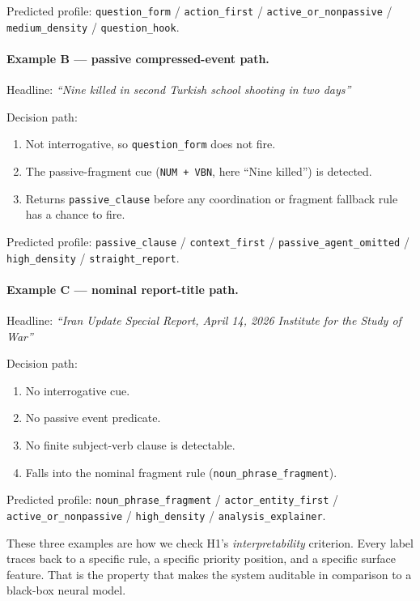\documentclass[11pt]{article}
\begin{document}
Predicted profile: \texttt{question\_form} / \texttt{action\_first} / \texttt{active\_or\_nonpassive} / \texttt{medium\_density} / \texttt{question\_hook}.

\paragraph{Example B --- passive compressed-event path.} Headline: \emph{``Nine killed in second Turkish school shooting in two days''}

Decision path:
\begin{enumerate}
    \item Not interrogative, so \texttt{question\_form} does not fire.
    \item The passive-fragment cue (\texttt{NUM + VBN}, here ``Nine killed'') is detected.
    \item Returns \texttt{passive\_clause} before any coordination or fragment fallback rule has a chance to fire.
\end{enumerate}

Predicted profile: \texttt{passive\_clause} / \texttt{context\_first} / \texttt{passive\_agent\_omitted} / \texttt{high\_density} / \texttt{straight\_report}.

\paragraph{Example C --- nominal report-title path.} Headline: \emph{``Iran Update Special Report, April 14, 2026 Institute for the Study of War''}

Decision path:
\begin{enumerate}
    \item No interrogative cue.
    \item No passive event predicate.
    \item No finite subject-verb clause is detectable.
    \item Falls into the nominal fragment rule (\texttt{noun\_phrase\_fragment}).
\end{enumerate}

Predicted profile: \texttt{noun\_phrase\_fragment} / \texttt{actor\_entity\_first} / \texttt{active\_or\_nonpassive} / \texttt{high\_density} / \texttt{analysis\_explainer}.

These three examples are how we check H1's \emph{interpretability} criterion. Every label traces back to a specific rule, a specific priority position, and a specific surface feature. That is the property that makes the system auditable in comparison to a black-box neural model.
\end{document}
